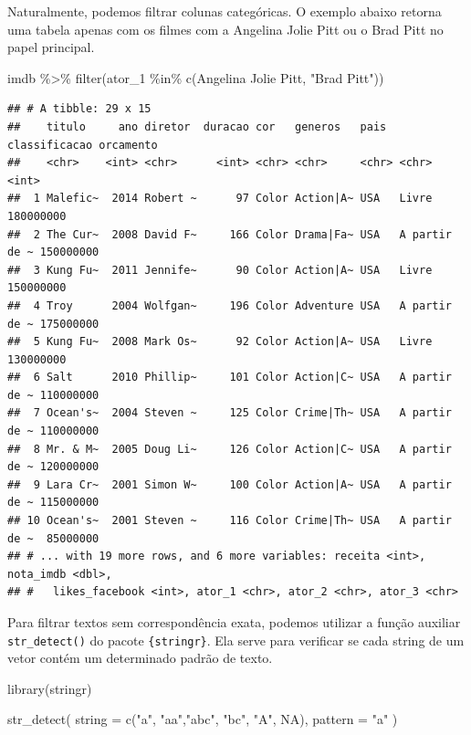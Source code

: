 \documentclass[
]{book}
\newenvironment{Shaded}{\begin{snugshade}}{\end{snugshade}}
\newcommand{\AttributeTok}[1]{\textcolor[rgb]{0.77,0.63,0.00}{#1}}
\newcommand{\ConstantTok}[1]{\textcolor[rgb]{0.00,0.00,0.00}{#1}}
\newcommand{\FunctionTok}[1]{\textcolor[rgb]{0.00,0.00,0.00}{#1}}
\newcommand{\NormalTok}[1]{#1}
\newcommand{\SpecialCharTok}[1]{\textcolor[rgb]{0.00,0.00,0.00}{#1}}
\newcommand{\StringTok}[1]{\textcolor[rgb]{0.31,0.60,0.02}{#1}}
\begin{document}
Naturalmente, podemos filtrar colunas categóricas. O exemplo abaixo retorna uma tabela apenas com os filmes com a Angelina Jolie Pitt ou o Brad Pitt no papel principal.

\begin{Shaded}
\begin{Highlighting}[]
\NormalTok{imdb }\SpecialCharTok{\%\textgreater{}\%}
  \FunctionTok{filter}\NormalTok{(ator\_1 }\SpecialCharTok{\%in\%} \FunctionTok{c}\NormalTok{(}\StringTok{\textquotesingle{}Angelina Jolie Pitt\textquotesingle{}}\NormalTok{, }\StringTok{"Brad Pitt"}\NormalTok{))}
\end{Highlighting}
\end{Shaded}

\begin{verbatim}
## # A tibble: 29 x 15
##    titulo     ano diretor  duracao cor   generos   pais  classificacao orcamento
##    <chr>    <int> <chr>      <int> <chr> <chr>     <chr> <chr>             <int>
##  1 Malefic~  2014 Robert ~      97 Color Action|A~ USA   Livre         180000000
##  2 The Cur~  2008 David F~     166 Color Drama|Fa~ USA   A partir de ~ 150000000
##  3 Kung Fu~  2011 Jennife~      90 Color Action|A~ USA   Livre         150000000
##  4 Troy      2004 Wolfgan~     196 Color Adventure USA   A partir de ~ 175000000
##  5 Kung Fu~  2008 Mark Os~      92 Color Action|A~ USA   Livre         130000000
##  6 Salt      2010 Phillip~     101 Color Action|C~ USA   A partir de ~ 110000000
##  7 Ocean's~  2004 Steven ~     125 Color Crime|Th~ USA   A partir de ~ 110000000
##  8 Mr. & M~  2005 Doug Li~     126 Color Action|C~ USA   A partir de ~ 120000000
##  9 Lara Cr~  2001 Simon W~     100 Color Action|A~ USA   A partir de ~ 115000000
## 10 Ocean's~  2001 Steven ~     116 Color Crime|Th~ USA   A partir de ~  85000000
## # ... with 19 more rows, and 6 more variables: receita <int>, nota_imdb <dbl>,
## #   likes_facebook <int>, ator_1 <chr>, ator_2 <chr>, ator_3 <chr>
\end{verbatim}

Para filtrar textos sem correspondência exata, podemos utilizar a função auxiliar \texttt{str\_detect()} do pacote \texttt{\{stringr\}}. Ela serve para verificar se cada string de um vetor contém um determinado padrão de texto.

\begin{Shaded}
\begin{Highlighting}[]
\FunctionTok{library}\NormalTok{(stringr)}

\FunctionTok{str\_detect}\NormalTok{(}
  \AttributeTok{string =} \FunctionTok{c}\NormalTok{(}\StringTok{"a"}\NormalTok{, }\StringTok{"aa"}\NormalTok{,}\StringTok{"abc"}\NormalTok{, }\StringTok{"bc"}\NormalTok{, }\StringTok{"A"}\NormalTok{, }\ConstantTok{NA}\NormalTok{), }
  \AttributeTok{pattern =} \StringTok{"a"}
\NormalTok{)}
\end{Highlighting}
\end{Shaded}
\end{document}
